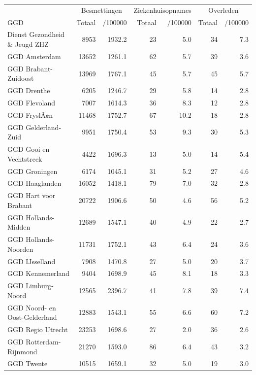 \documentclass[
  english,
  man,floatsintext]{apa6}
\begin{document}
\begin{table}
\centering\begingroup\fontsize{10}{12}\selectfont

\begin{threeparttable}
\begin{tabular}{lrrrrrr}
\toprule
\multicolumn{1}{c}{ } & \multicolumn{2}{c}{Besmettingen} & \multicolumn{2}{c}{Ziekenhuisopnames} & \multicolumn{2}{c}{Overleden} \\
\cmidrule(l{3pt}r{3pt}){2-3} \cmidrule(l{3pt}r{3pt}){4-5} \cmidrule(l{3pt}r{3pt}){6-7}
GGD & Totaal & /100000 & Totaal & /100000 & Totaal & /100000\\
\midrule
Dienst Gezondheid \& Jeugd ZHZ & 8953 & 1932.2 & 23 & 5.0 & 34 & 7.3\\
GGD Amsterdam & 13652 & 1261.1 & 62 & 5.7 & 39 & 3.6\\
GGD Brabant-Zuidoost & 13969 & 1767.1 & 45 & 5.7 & 45 & 5.7\\
GGD Drenthe & 6205 & 1246.7 & 29 & 5.8 & 14 & 2.8\\
GGD Flevoland & 7007 & 1614.3 & 36 & 8.3 & 12 & 2.8\\
GGD FryslÃ¢n & 11468 & 1752.7 & 67 & 10.2 & 18 & 2.8\\
GGD Gelderland-Zuid & 9951 & 1750.4 & 53 & 9.3 & 30 & 5.3\\
GGD Gooi en Vechtstreek & 4422 & 1696.3 & 13 & 5.0 & 14 & 5.4\\
GGD Groningen & 6174 & 1045.1 & 31 & 5.2 & 27 & 4.6\\
GGD Haaglanden & 16052 & 1418.1 & 79 & 7.0 & 32 & 2.8\\
GGD Hart voor Brabant & 20722 & 1906.6 & 50 & 4.6 & 56 & 5.2\\
GGD Hollands-Midden & 12689 & 1547.1 & 40 & 4.9 & 22 & 2.7\\
GGD Hollands-Noorden & 11731 & 1752.1 & 43 & 6.4 & 24 & 3.6\\
GGD IJsselland & 7908 & 1470.8 & 27 & 5.0 & 20 & 3.7\\
GGD Kennemerland & 9404 & 1698.9 & 45 & 8.1 & 18 & 3.3\\
GGD Limburg-Noord & 12565 & 2396.7 & 41 & 7.8 & 39 & 7.4\\
GGD Noord- en Oost-Gelderland & 12883 & 1543.1 & 55 & 6.6 & 60 & 7.2\\
GGD Regio Utrecht & 23253 & 1698.6 & 27 & 2.0 & 36 & 2.6\\
GGD Rotterdam-Rijnmond & 21270 & 1593.0 & 86 & 6.4 & 43 & 3.2\\
GGD Twente & 10515 & 1659.1 & 32 & 5.0 & 19 & 3.0\\

\end{tabular}
\end{threeparttable}
\end{table}
\end{document}
